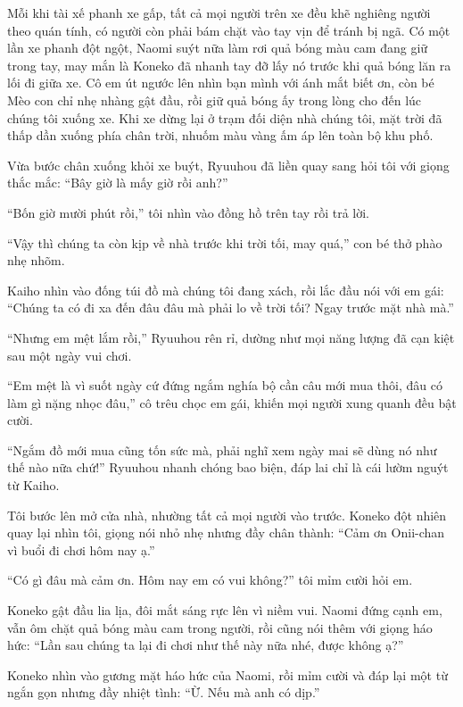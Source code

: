 ﻿\documentclass[../main.tex]{subfiles}
\begin{document}
Mỗi khi tài xế phanh xe gấp, tất cả mọi người trên xe đều khẽ nghiêng người theo quán tính, có người còn phải bám chặt vào tay vịn để tránh bị ngã. Có một lần xe phanh đột ngột, Naomi suýt nữa làm rơi quả bóng màu cam đang giữ trong tay, may mắn là Koneko đã nhanh tay đỡ lấy nó trước khi quả bóng lăn ra lối đi giữa xe. Cô em út ngước lên nhìn bạn mình với ánh mắt biết ơn, còn bé Mèo con chỉ nhẹ nhàng gật đầu, rồi giữ quả bóng ấy trong lòng cho đến lúc chúng tôi xuống xe. Khi xe dừng lại ở trạm đối diện nhà chúng tôi, mặt trời đã thấp dần xuống phía chân trời, nhuốm màu vàng ấm áp lên toàn bộ khu phố.

Vừa bước chân xuống khỏi xe buýt, Ryuuhou đã liền quay sang hỏi tôi với giọng thắc mắc: ``Bây giờ là mấy giờ rồi anh?''

``Bốn giờ mười phút rồi,'' tôi nhìn vào đồng hồ trên tay rồi trả lời.

``Vậy thì chúng ta còn kịp về nhà trước khi trời tối, may quá,'' con bé thở phào nhẹ nhõm.

Kaiho nhìn vào đống túi đồ mà chúng tôi đang xách, rồi lắc đầu nói với em gái: ``Chúng ta có đi xa đến đâu đâu mà phải lo về trời tối? Ngay trước mặt nhà mà.''

``Nhưng em mệt lắm rồi,'' Ryuuhou rên rỉ, dường như mọi năng lượng đã cạn kiệt sau một ngày vui chơi.

``Em mệt là vì suốt ngày cứ đứng ngắm nghía bộ cần câu mới mua thôi, đâu có làm gì nặng nhọc đâu,'' cô trêu chọc em gái, khiến mọi người xung quanh đều bật cười.

``Ngắm đồ mới mua cũng tốn sức mà, phải nghĩ xem ngày mai sẽ dùng nó như thế nào nữa chứ!'' Ryuuhou nhanh chóng bao biện, đáp lai chỉ là cái lườm nguýt từ Kaiho.

Tôi bước lên mở cửa nhà, nhường tất cả mọi người vào trước. Koneko đột nhiên quay lại nhìn tôi, giọng nói nhỏ nhẹ nhưng đầy chân thành: ``Cảm ơn Onii-chan vì buổi đi chơi hôm nay ạ.''

``Có gì đâu mà cảm ơn. Hôm nay em có vui không?'' tôi mỉm cười hỏi em.

Koneko gật đầu lia lịa, đôi mắt sáng rực lên vì niềm vui. Naomi đứng cạnh em, vẫn ôm chặt quả bóng màu cam trong người, rồi cũng nói thêm với giọng háo hức: ``Lần sau chúng ta lại đi chơi như thế này nữa nhé, được không ạ?''

Koneko nhìn vào gương mặt háo hức của Naomi, rồi mỉm cười và đáp lại một từ ngắn gọn nhưng đầy nhiệt tình: ``Ừ. Nếu mà anh có dịp.''

\ct
\end{document}

